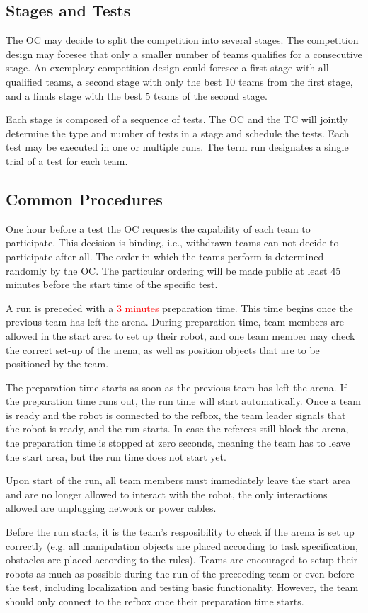 \subsection{Stages and Tests}
The OC may decide to split the competition into several stages. The competition design may foresee that only a smaller number of teams qualifies for a consecutive stage. An exemplary competition design could foresee a first stage with all qualified teams, a second stage with only the best 10 teams from the first stage, and a finals stage with the best 5 teams of the second stage.
\par
Each stage is composed of a sequence of tests. The OC and the TC will jointly determine the type and number of tests in a stage and schedule the tests.
Each test may be executed in one or multiple runs. The term run designates a single trial of a test for each team.


\subsection{Common Procedures}
One hour before a test the OC requests the capability of each team to participate.
This decision is binding, i.e., withdrawn teams can not decide to participate after all.
The order in which the teams perform is determined randomly by the OC.
The particular ordering will be made public at least 45 minutes before the start time of the specific test.

\par
A run is preceded with a \textcolor{red}{3 minutes} preparation time. This time begins once the previous team has left the arena.
During preparation time, team members are allowed in the start area to set up their robot, and one team member may check the correct set-up of the arena, as well as position objects that are to be positioned by the team. %
\par
The preparation time starts as soon as the previous team has left the arena. If the preparation time runs out, the run time will start automatically.
Once a team is ready and the robot is connected to the refbox, the team leader signals that the robot is ready, and the run starts.
In case the referees still block the arena, the preparation time is stopped at zero seconds, meaning the team has to leave the start area, but the run time does not start yet.
\par
Upon start of the run, all team members must immediately leave the start area and are no longer allowed to interact with the robot, the only interactions allowed are unplugging network or power cables.
\par
Before the run starts, it is the team's resposibility to check if the arena is set up correctly (e.g. all manipulation objects are placed according to task specification, obstacles are placed according to the rules).
Teams are encouraged to setup their robots as much as possible during the run of the preceeding team or even before the test, including localization and testing basic functionality. However, the team should only connect to the refbox once their preparation time starts.
\par

